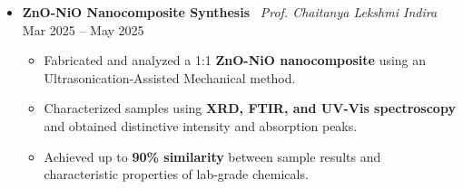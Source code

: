 \documentclass[letterpaper,9pt]{article}
\begin{document}
\begin{itemize}[leftmargin=0pt, parsep=0pt, itemsep=0.4em]
\begin{itemize}[leftmargin=0pt, parsep=0pt, itemsep=0.8em]
\vspace{0.7em}


\item[] \textbf{ZnO-NiO Nanocomposite Synthesis} \textbar\ \textit{Prof. Chaitanya Lekshmi Indira} \hfill Mar 2025 -- May 2025
{\small
\begin{itemize}[leftmargin=1em, label=\textbullet, itemsep=0.2pt, parsep=0pt, topsep=1pt]
    \item Fabricated and analyzed a 1:1 \textbf{ZnO-NiO nanocomposite} using an Ultrasonication-Assisted Mechanical method.
    \item Characterized samples using \textbf{XRD, FTIR, and UV-Vis spectroscopy} and obtained distinctive intensity and absorption peaks.
    \item Achieved up to \textbf{90\% similarity} between sample results and characteristic properties of lab-grade chemicals.
    
\end{itemize}
}

\end{itemize}
    

\end{itemize}
\end{document}
